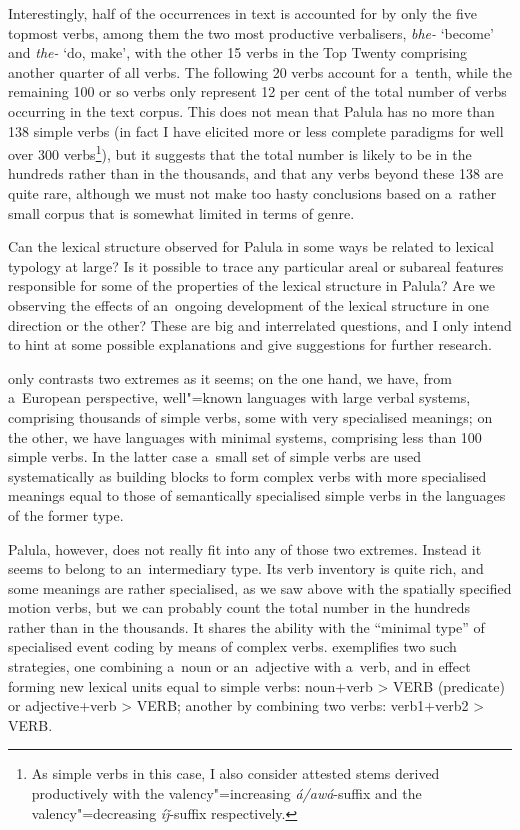 Interestingly, half of the occurrences in text is accounted for by only the five topmost verbs, among them the two most productive verbalisers, \textit{bhe-} `become' and \textit{the-} `do, make', with the other 15 verbs in the Top Twenty comprising another quarter of all verbs. The following 20 verbs account for a~tenth, while the remaining 100 or so verbs only represent 12 per cent of the total number of verbs occurring in the text corpus. This does not mean that Palula has no more than 138 simple verbs (in fact I have elicited more or less complete paradigms for well over 300 verbs\footnote{As simple verbs in this case, I also consider attested stems derived productively with the valency"=increasing \textit{á/awá}-suffix and the valency"=decreasing \textit{íǰ}-suffix respectively.}), but it suggests that the total number is likely to be in the hundreds rather than in the thousands, and that any verbs beyond these 138 are quite rare, although we must not make too hasty conclusions based on a~rather small corpus that is somewhat limited in terms of genre.



Can the lexical structure observed for Palula in some ways be related to lexical typology at large? Is it possible to trace any particular areal or subareal features responsible for some of the properties of the lexical structure in Palula? Are we observing the effects of an~ongoing development of the lexical structure in one direction or the other? These are big and interrelated questions, and I only intend to hint at some possible explanations and give suggestions for further research.



\citet[409]{viberg2006} only contrasts two extremes as it seems; on the one hand, we have, from a~European perspective, well"=known languages with large verbal systems, comprising thousands of simple verbs, some with very specialised meanings; on the other, we have languages with minimal systems, comprising less than 100 simple verbs. In the latter case a~small set of simple verbs are used systematically as building blocks to form complex verbs with more specialised meanings equal to those of semantically specialised simple verbs in the languages of the former type. 



Palula, however, does not really fit into any of those two extremes. Instead it seems to belong to an~intermediary type. Its verb inventory is quite rich, and some meanings are rather specialised, as we saw above with the spatially specified motion verbs, but we can probably count the total number in the hundreds rather than in the thousands. It shares the ability with the ``minimal type'' of specialised event coding by means of complex verbs. \citet[348]{viberg2006} exemplifies two such strategies, one combining a~noun or an~adjective with a~verb, and in effect forming new lexical units equal to simple verbs: noun+verb {\textgreater} VERB (predicate) or adjective+verb {\textgreater} VERB; another by combining two verbs: verb1+verb2 {\textgreater} VERB. 




